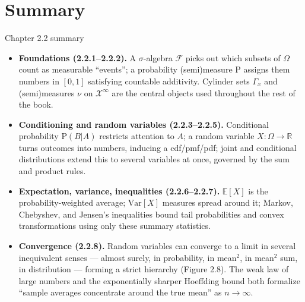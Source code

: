 \documentclass[aspectratio=169,10pt]{beamer}
\begin{document}
\section{Summary}

\begin{frame}{Chapter 2.2 summary}
\begin{itemize}
\item \textbf{Foundations (2.2.1--2.2.2).} A $\sigma$-algebra $\mathcal{F}$
picks out which subsets of $\Omega$ count as measurable ``events''; a
probability (semi)measure $\mathrm{P}$ assigns them numbers in $[0,1]$
satisfying countable additivity. Cylinder sets $\Gamma_x$ and (semi)measures
$\nu$ on $\mathcal{X}^\infty$ are the central objects used throughout the
rest of the book.
\item \textbf{Conditioning and random variables (2.2.3--2.2.5).} Conditional
probability $\mathrm{P}(B|A)$ restricts attention to $A$; a random variable
$X:\Omega\to\mathbb{R}$ turns outcomes into numbers, inducing a cdf/pmf/pdf;
joint and conditional distributions extend this to several variables at
once, governed by the sum and product rules.
\item \textbf{Expectation, variance, inequalities (2.2.6--2.2.7).}
$\mathbb{E}[X]$ is the probability-weighted average; $\mathrm{Var}[X]$
measures spread around it; Markov, Chebyshev, and Jensen's inequalities
bound tail probabilities and convex transformations using only these
summary statistics.
\item \textbf{Convergence (2.2.8).} Random variables can converge to a limit
in several inequivalent senses --- almost surely, in probability, in mean$^2$,
in mean$^2$ sum, in distribution --- forming a strict hierarchy
(Figure 2.8). The weak law of large numbers and the exponentially sharper
Hoeffding bound both formalize ``sample averages concentrate around the true
mean'' as $n\to\infty$.
\end{itemize}
\end{frame}
\end{document}
